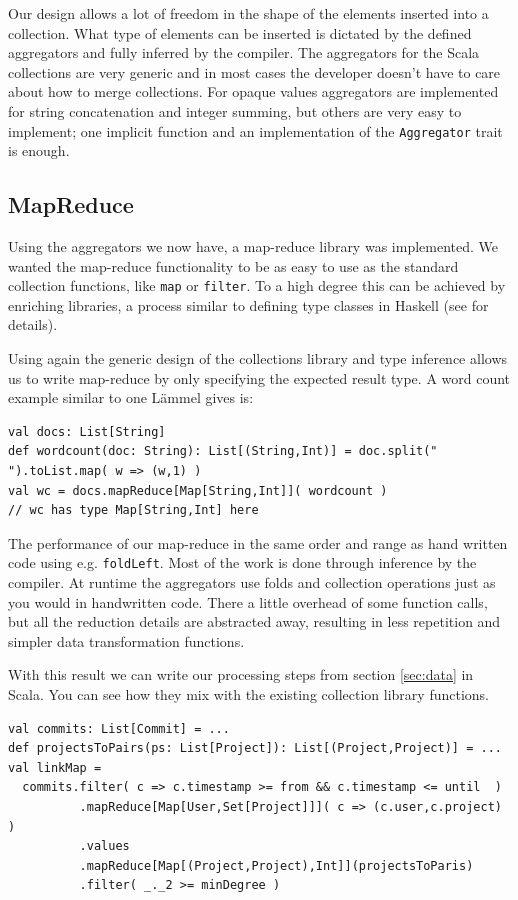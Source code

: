 \documentclass[10pt,a4paper]{article}
\begin{document}
Our design allows a lot of freedom in the shape of the elements inserted into a collection. What type of elements can be inserted is dictated by the defined aggregators and fully inferred by the compiler. The aggregators for the Scala collections are very generic and in most cases the developer doesn't have to care about how to merge collections. For opaque values aggregators are implemented for string concatenation and integer summing, but others are very easy to implement; one implicit function and an implementation of the \lstinline|Aggregator| trait is enough.

\subsection{MapReduce}

Using the aggregators we now have, a map-reduce library was implemented. We wanted the map-reduce functionality to be as easy to use as the standard collection functions, like \lstinline|map| or \lstinline|filter|. To a high degree this can be achieved by enriching libraries, a process similar to defining type classes in Haskell (see \cite{odersky2006pimp} for details).

Using again the generic design of the collections library and type inference allows us to write map-reduce by only specifying the expected result type. A word count example similar to one L\"ammel gives is:
\begin{lstlisting}
val docs: List[String]
def wordcount(doc: String): List[(String,Int)] = doc.split(" ").toList.map( w => (w,1) )
val wc = docs.mapReduce[Map[String,Int]]( wordcount )
// wc has type Map[String,Int] here
\end{lstlisting}

The performance of our map-reduce in the same order and range as hand written code using e.g. \lstinline|foldLeft|. Most of the work is done through inference by the compiler. At runtime the aggregators use folds and collection operations just as you would in handwritten code. There a little overhead of some function calls, but all the reduction details are abstracted away, resulting in less repetition and simpler data transformation functions.

With this result we can write our processing steps from section \ref{sec:data} in Scala. You can see how they mix with the existing collection library functions.
\begin{lstlisting}
val commits: List[Commit] = ...
def projectsToPairs(ps: List[Project]): List[(Project,Project)] = ...
val linkMap = 
  commits.filter( c => c.timestamp >= from && c.timestamp <= until  )
          .mapReduce[Map[User,Set[Project]]]( c => (c.user,c.project) )
          .values
          .mapReduce[Map[(Project,Project),Int]](projectsToParis)
          .filter( _._2 >= minDegree )
\end{lstlisting}
\end{document}
